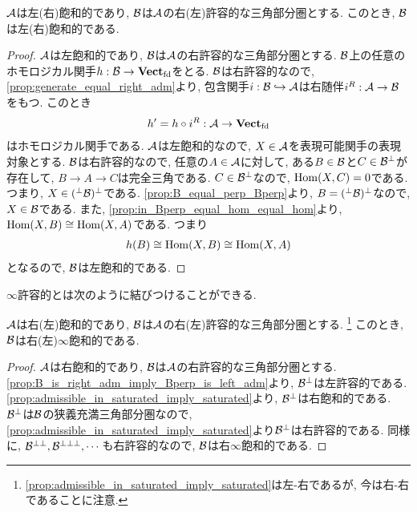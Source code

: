 \documentclass[uplatex, a4paper, 14Q, dvipdfmx]{jsarticle}
\begin{document}
\begin{theorem} \label{prop:admissible_in_saturated_imply_saturated}
  $\mathcal{A}$は左(右)飽和的であり, $\mathcal{B}$は$\mathcal{A}$の右(左)許容的な三角部分圏とする. 
  このとき, $\mathcal{B}$は左(右)飽和的である.
\end{theorem}

\begin{proof}
  $\mathcal{A}$は左飽和的であり, $\mathcal{B}$は$\mathcal{A}$の右許容的な三角部分圏とする. 
  $\mathcal{B}$上の任意のホモロジカル関手$h : \mathcal{B} \to \mathbf{Vect}_{\mathrm{fd}}$をとる. 
  $\mathcal{B}$は右許容的なので, \cref{prop:generate_equal_right_adm}より, 包含関手$i : \mathcal{B} \hookrightarrow \mathcal{A}$は右随伴$i^R : \mathcal{A} \to \mathcal{B}$をもつ.
  このとき
  \begin{align*}
    h' = h \circ i^R : \mathcal{A} \to \mathbf{Vect}_{\mathrm{fd}}
  \end{align*}
  はホモロジカル関手である. 
  $\mathcal{A}$は左飽和的なので, $X \in \mathcal{A}$を表現可能関手の表現対象とする. 
  $\mathcal{B}$は右許容的なので, 任意の$A \in \mathcal{A}$に対して, ある$B \in \mathcal{B}$と$C \in \mathcal{B}^\perp$が存在して, $B \to A \to C$は完全三角である.
  $C \in \mathcal{B}^\perp$なので, $\mathrm{Hom}(X,C) = 0$である. 
  つまり, $X \in ({}^\perp \mathcal{B})^\perp$である. 
  \cref{prop:B_equal_perp_Bperp}より, $B = ({}^\perp \mathcal{B})^\perp$なので, $X \in \mathcal{B}$である. 
  また, \cref{prop:in_Bperp_equal_hom_equal_hom}より, $\mathrm{Hom}(X,B) \cong \mathrm{Hom}(X, A)$である. 
  つまり
  \begin{align*}
    h(B) 
    \cong \mathrm{Hom}(X,B)
    \cong \mathrm{Hom}(X,A)
  \end{align*}
  となるので, $\mathcal{B}$は左飽和的である.
\end{proof}

$\infty$許容的とは次のように結びつけることができる. 

\begin{corollary} \label{prop:same_direction_admissible_in_saturated_imply_saturated}
  $\mathcal{A}$は右(左)飽和的であり, $\mathcal{B}$は$\mathcal{A}$の右(左)許容的な三角部分圏とする. 
  \footnote{
    \cref{prop:admissible_in_saturated_imply_saturated}は左-右であるが, 今は右-右であることに注意. 
  }
  このとき, $\mathcal{B}$は右(左)$\infty$飽和的である.
\end{corollary}

\begin{proof}
  $\mathcal{A}$は右飽和的であり, $\mathcal{B}$は$\mathcal{A}$の右許容的な三角部分圏とする. 
  \cref{prop:B_is_right_adm_imply_Bperp_is_left_adm}より, $\mathcal{B}^\perp$は左許容的である. 
  \cref{prop:admissible_in_saturated_imply_saturated}より, $\mathcal{B}^\perp$は右飽和的である. 
  $\mathcal{B}^\perp$は$\mathcal{B}$の狭義充満三角部分圏なので, \cref{prop:admissible_in_saturated_imply_saturated}より$\mathcal{B}^\perp$は右許容的である. 
  同様に, $\mathcal{B}^{\perp\perp}, \mathcal{B}^{\perp\perp\perp}, \cdots$も右許容的なので, $\mathcal{B}$は右$\infty$飽和的である.
\end{proof}
\end{document}
